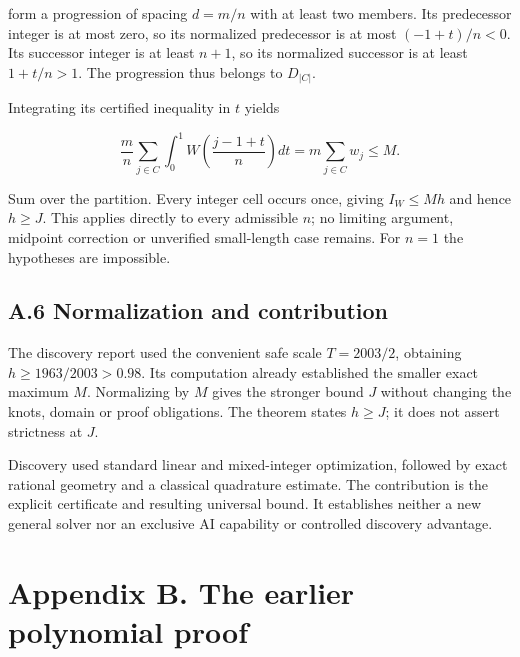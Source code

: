 \documentclass[11pt,a4paper]{article}
\begin{document}
form a progression of spacing \(d=m/n\) with at least two members. Its
predecessor integer is at most zero, so its normalized predecessor is at
most \((-1+t)/n<0\). Its successor integer is at least \(n+1\), so its
normalized successor is at least \(1+t/n>1\). The progression thus
belongs to \(D_{|C|}\).

\begin{samepage}

Integrating its certified inequality in \(t\) yields

\[
\frac mn\sum_{j\in C}\int_0^1W\!\left(\frac{j-1+t}{n}\right)dt
=m\sum_{j\in C}w_j\le M.
\]

\end{samepage}

Sum over the partition. Every integer cell occurs once, giving
\(I_W\le Mh\) and hence \(h\ge J\). This applies directly to every
admissible \(n\); no limiting argument, midpoint correction or
unverified small-length case remains. For \(n=1\) the hypotheses are
impossible.


\hypertarget{a.6-normalization-and-contribution}{%
\subsection{A.6 Normalization and
contribution}\label{a.6-normalization-and-contribution}}

The discovery report used the convenient safe scale \(T=2003/2\),
obtaining \(h\ge1963/2003>0.98\). Its computation already established
the smaller exact maximum \(M\). Normalizing by \(M\) gives the stronger
bound \(J\) without changing the knots, domain or proof obligations. The
theorem states \(h\ge J\); it does not assert strictness at \(J\).

Discovery used standard linear and mixed-integer optimization, followed
by exact rational geometry and a classical quadrature estimate. The
contribution is the explicit certificate and resulting universal bound.
It establishes neither a new general solver nor an exclusive AI
capability or controlled discovery advantage.


\hypertarget{appendix-b.-the-earlier-polynomial-proof}{%
\section{Appendix B. The earlier polynomial
proof}\label{appendix-b.-the-earlier-polynomial-proof}}
\end{document}
